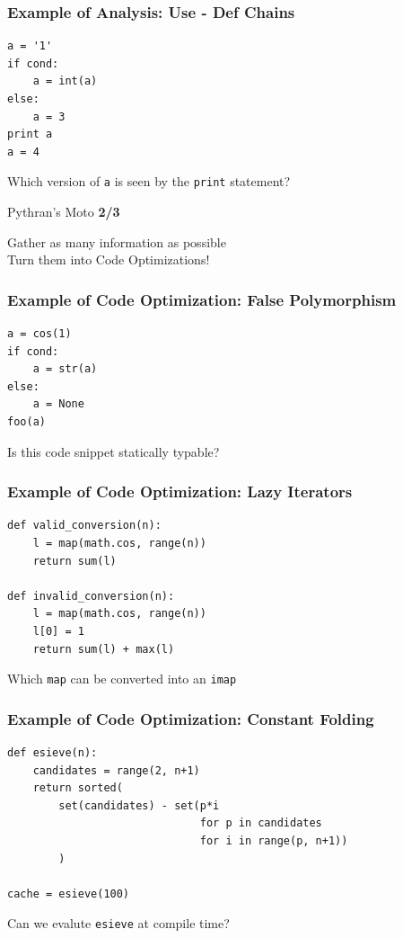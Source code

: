 \documentclass[aspectratio=1610]{beamer}
\begin{document}
\begin{frame}[fragile]
    \frametitle{Example of Analysis: Use - Def Chains}
    \begin{lstlisting}[lang=python]
a = '1'
if cond:
    a = int(a)
else:
    a = 3
print a
a = 4
    \end{lstlisting}
    \vfill\centering\Large Which version of \texttt{a} is seen by the \texttt{print} statement?
\end{frame}

\begin{frame}{Pythran's Moto \textbf{2/3}}
    \begin{center}
        Gather as many information as possible\\
        \vfill
        \Large Turn them into Code Optimizations!
        \vfill
    \end{center}
\end{frame}


\begin{frame}[fragile]
    \frametitle{Example of Code Optimization: False Polymorphism}
    \begin{lstlisting}
a = cos(1)
if cond:
    a = str(a)
else:
    a = None
foo(a)
\end{lstlisting}
\vfill\centering\Large Is this code snippet statically typable?
\end{frame}

\begin{frame}[fragile]
    \frametitle{Example of Code Optimization: Lazy Iterators}
    \begin{lstlisting}
def valid_conversion(n):
    l = map(math.cos, range(n))
    return sum(l)

def invalid_conversion(n):
    l = map(math.cos, range(n))
    l[0] = 1
    return sum(l) + max(l)
    \end{lstlisting}
    \vfill\centering\Large Which \texttt{map} can be converted into an \texttt{imap}
\end{frame}

\begin{frame}[fragile]
    \frametitle{Example of Code Optimization: Constant Folding}
    \begin{lstlisting}[lang=python]
def esieve(n):
    candidates = range(2, n+1)
    return sorted(
        set(candidates) - set(p*i
                              for p in candidates
                              for i in range(p, n+1))
        )

cache = esieve(100)
    \end{lstlisting}
    \vfill\centering\Large Can we evalute \texttt{esieve} at compile time?

\end{frame}
\end{document}
